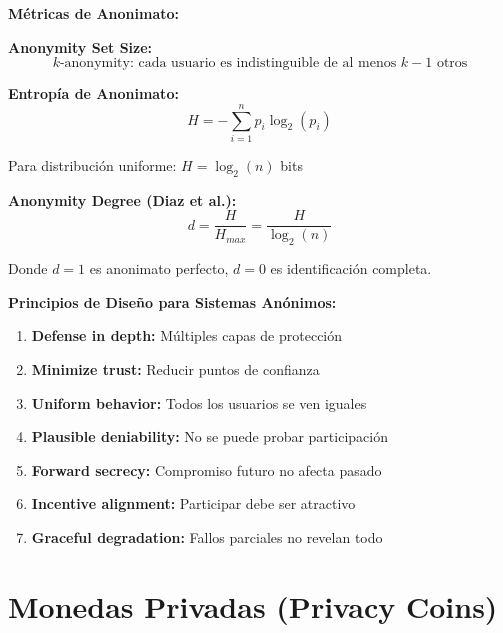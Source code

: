 \documentclass[11pt,a4paper,twoside]{book}
\begin{document}
\begin{mathnote}
\textbf{M\'etricas de Anonimato:}

\textbf{Anonymity Set Size:}
\[
k\text{-anonymity: cada usuario es indistinguible de al menos } k-1 \text{ otros}
\]

\textbf{Entrop\'ia de Anonimato:}
\[
H = -\sum_{i=1}^{n} p_i \log_2(p_i)
\]

Para distribuci\'on uniforme: $H = \log_2(n)$ bits

\textbf{Anonymity Degree (Diaz et al.):}
\[
d = \frac{H}{H_{max}} = \frac{H}{\log_2(n)}
\]

Donde $d = 1$ es anonimato perfecto, $d = 0$ es identificaci\'on completa.
\end{mathnote}

\begin{keyidea}
\textbf{Principios de Dise\~no para Sistemas An\'onimos:}

\begin{enumerate}
    \item \textbf{Defense in depth:} M\'ultiples capas de protecci\'on
    \item \textbf{Minimize trust:} Reducir puntos de confianza
    \item \textbf{Uniform behavior:} Todos los usuarios se ven iguales
    \item \textbf{Plausible deniability:} No se puede probar participaci\'on
    \item \textbf{Forward secrecy:} Compromiso futuro no afecta pasado
    \item \textbf{Incentive alignment:} Participar debe ser atractivo
    \item \textbf{Graceful degradation:} Fallos parciales no revelan todo
\end{enumerate}
\end{keyidea}



\chapter{Monedas Privadas (Privacy Coins)}
\label{ch:monedas-privadas}
\end{document}
